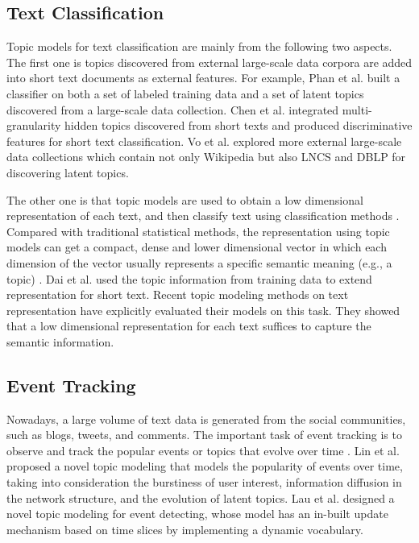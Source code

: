 \documentclass[10pt,journal,compsoc]{IEEEtran}
\begin{document}
{\subsection{Text Classification}

Topic models for text classification are mainly from the following two aspects. The first one is topics discovered from external large-scale data corpora are added into short text documents as external features. For example, Phan et al. \cite{phan2008learning} built a classifier on both a set of labeled training data and a set of latent topics discovered from a large-scale data collection. Chen et al. \cite{chen2011short} integrated multi-granularity hidden topics discovered from short texts and produced discriminative features for short text classification. Vo et al. \cite{vo2015learning} explored more external large-scale data collections which contain not only Wikipedia but also LNCS and DBLP for discovering latent topics. 

The other one is that topic models are used to obtain a low dimensional representation of each text, and then classify text using classification methods \cite{dai2013crest,razavi2014text}. Compared with traditional statistical methods, the representation using topic models can get a compact, dense and lower dimensional vector in which each dimension of the vector usually represents a specific semantic meaning (e.g., a topic) \cite{nigam2000text}. Dai et al. \cite{dai2013crest} used the topic information from training data to extend representation for short text. Recent topic modeling methods on text representation have explicitly evaluated their models on this task. They showed that a low dimensional representation for each text suffices to capture the semantic information.


\subsection{Event Tracking}

Nowadays, a large volume of text data is generated from the social communities, such as blogs, tweets, and comments. The important task of event tracking is to observe and track the popular events or topics that evolve over time \cite{lin2010pet,aggarwal2012event,ritter2012open}. Lin et al. \cite{lin2010pet} proposed a novel topic modeling that models the popularity of events over time, taking into consideration the burstiness of user interest, information diffusion in the network structure, and the evolution of latent topics. Lau et al. \cite{lau2012line} designed a novel topic modeling for event detecting, whose model has an in-built update mechanism based on time slices by implementing a dynamic vocabulary. 

}
\end{document}
